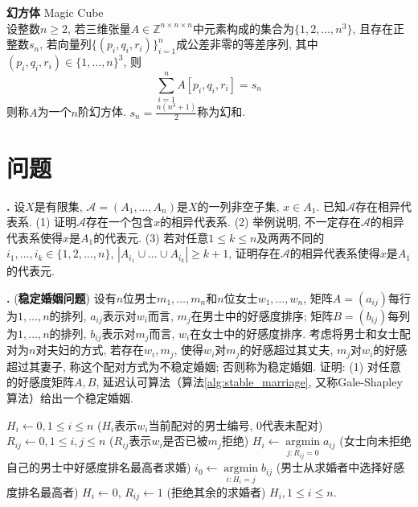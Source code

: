 \begin{dfn}\textbf{幻方体} Magic Cube\\
设整数$n\ge 2$, 若三维张量$A\in \mathbb{Z}^{n\times n\times n}$中元素构成的集合为$\{1,2,\dots,n^3\}$, 且存在正整数$s_n$, 若向量列$\{(p_i,q_i,r_i)\}_{i=1}^n$成公差非零的等差序列, 其中$(p_i,q_i,r_i)\in \{1,\dots, n\}^3$, 则
\begin{equation}
    \sum_{i=1}^n A[p_i,q_i,r_i] = s_n
\end{equation}
则称$A$为一个$n$阶幻方体. $s_n=\frac{n(n^3+1)}{2}$称为幻和. 
\end{dfn}


\section*{问题}


\par \textbf{\theprobdes .} \cite{IC} 设$X$是有限集, $\mathcal{A}=(A_1,\dots, A_n)$是$X$的一列非空子集, $x\in A_1$. 已知$\mathcal{A}$存在相异代表系. 
(1) 证明$\mathcal{A}$存在一个包含$x$的相异代表系. (2) 举例说明, 不一定存在$\mathcal{A}$的相异代表系使得$x$是$A_1$的代表元. (3) 若对任意$1\le k \le n$及两两不同的$i_1,\dots,i_k \in \{1,2,\dots,n\}$, $|A_{i_1} \cup \dots \cup A_{i_k}| \ge k+1$, 证明存在$\mathcal{A}$的相异代表系使得$x$是$A_1$的代表元.

\par \textbf{\theprobdes .} (\textbf{稳定婚姻问题}) 设有$n$位男士$m_1,\dots,m_n$和$n$位女士$w_1,\dots,w_n$, 矩阵$A=(a_{ij})$每行为$1,\dots,n$的排列, $a_{ij}$表示对$w_i$而言, $m_j$在男士中的好感度排序; 矩阵$B=(b_{ij})$每列为$1,\dots,n$的排列, $b_{ij}$表示对$m_j$而言, $w_i$在女士中的好感度排序. 考虑将男士和女士配对为$n$对夫妇的方式, 若存在$w_i,m_j$, 使得$w_i$对$m_j$的好感超过其丈夫, $m_j$对$w_i$的好感超过其妻子, 称这个配对方式为不稳定婚姻; 否则称为稳定婚姻. 证明: (1) 对任意的好感度矩阵$A,B$, 延迟认可算法（算法\ref{alg:stable_marriage}, 又称Gale-Shapley算法）给出一个稳定婚姻. 

\begin{algorithm}[ht!]
\caption{构造稳定婚姻的延迟认可算法} 
\label{alg:stable_marriage}
$H_i \leftarrow 0, 1\le i\le n$  ($H_i$表示$w_i$当前配对的男士编号, 0代表未配对)\;
$R_{ij} \leftarrow 0, 1\le i,j\le n$  ($R_{ij}$表示$w_i$是否已被$m_j$拒绝)\;
 {
{
    $H_i \leftarrow \operatorname{\arg\min}\limits_{j: R_{ij}=0} a_{ij}$ (女士向未拒绝自己的男士中好感度排名最高者求婚)\; 
}
{
    $i_0 \leftarrow \operatorname{\arg\min}\limits_{i: H_i=j} b_{ij}$ (男士从求婚者中选择好感度排名最高者)\; 
    {
        $H_i \leftarrow 0$, $R_{ij} \leftarrow 1$ (拒绝其余的求婚者)\; 
    }
}
}
\Return $H_i, 1\le i\le n$.
\end{algorithm}


